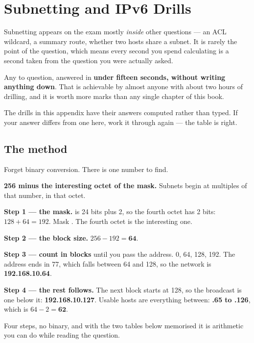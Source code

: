 \chapter{Subnetting and IPv6 Drills}\label{app:subnetting}

Subnetting appears on the exam mostly \emph{inside} other questions --- an ACL
wildcard, a summary route, whether two hosts share a subnet. It is rarely the
point of the question, which means every second you spend calculating is a second
taken from the question you were actually asked.

\begin{alertbox}
Any  to  question, answered in \textbf{under fifteen seconds,
without writing anything down}. That is achievable by almost anyone with about
two hours of drilling, and it is worth more marks than any single chapter of this
book.

The drills in this appendix have their answers computed rather than typed. If
your answer differs from one here, work it through again --- the table is right.
\end{alertbox}

\section{The method}

Forget binary conversion. There is one number to find.

\begin{definitionbox}
\textbf{256 minus the interesting octet of the mask.} Subnets begin at multiples
of that number, in that octet.
\end{definitionbox}

\begin{worked}[192.168.10.77/26]
\textbf{Step 1 --- the mask.}  is 24 bits plus 2, so the fourth octet
has 2 bits: $128+64 = 192$. Mask . The fourth octet is the
interesting one.

\textbf{Step 2 --- the block size.} $256 - 192 = \mathbf{64}$.

\textbf{Step 3 --- count in blocks} until you pass the address. 0, 64, 128, 192.
The address ends in 77, which falls between 64 and 128, so the network is
\textbf{192.168.10.64}.

\textbf{Step 4 --- the rest follows.} The next block starts at 128, so the
broadcast is one below it: \textbf{192.168.10.127}. Usable hosts are everything
between: \textbf{.65 to .126}, which is $64 - 2 = \mathbf{62}$.

Four steps, no binary, and with the two tables below memorised it is arithmetic
you can do while reading the question.
\end{worked}

